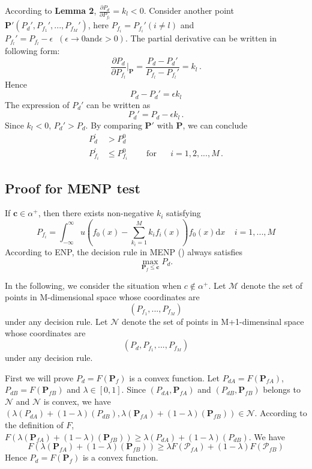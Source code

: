 \documentclass[12pt,journal,a4paper,twoside,onecolumn]{IEEEtran}
\newcommand{\rmnum}[1]{\romannumeral #1}
\begin{document}
\begin{spacing}{2.5}
According to \textbf{Lemma 2}, $\frac{\partial P_d}{\partial P_{f_l}} = k_l < 0$. Consider another point $\mathbf{P}' (P_d', P_{f_1}', ..., P_{f_M}')$, here $P_{f_i} = P_{f_i}' (i \neq l)$ and $P_{f_l}' = P_{f_l} - \epsilon \;\;(\epsilon \rightarrow 0 \text{and} \epsilon >0)$. The partial derivative can be written in following form:
 \begin{equation}
   \frac{\partial P_d}{ \partial P_{f_l}} \bigg|_{\mathbf{P}} = \frac{P_d - P_d'}{P_{f_l} - P_{f_l}'} = k_l\,.
 \end{equation}
 Hence
 \begin{equation}
   P_d - P_d' = \epsilon k_l
 \end{equation}
 The expression of $P_d'$ can be written as
 \begin{equation}
   P_d'= P_d - \epsilon k_l\,.
 \end{equation}
Since $k_l < 0$, $P_d' > P_d$. By comparing $\mathbf{P}'$ with $\mathbf{P}$, we can conclude
\begin{equation}
\begin{split}
  P_{d}^\prime &> P_{d}^0\\
  P_{f_i}^\prime &\leq P_{f_i}^0 \;\;\;\;\;\;\;\;\text{for}\;\;\;\;\;\; i=1, 2, ..., M\,.
\end{split}
\end{equation}

\subsection{Proof for MENP test}
If $\mathbf{c} \in \alpha^+$, then there exists non-negative $k_i$ satisfying
\[
P_{f_i} = \int_{-\infty}^{\infty} u(f_0(x) - \sum_{k_i=1}^{M}k_if_i(x))f_0(x)\mathrm{d}x \;\;\;\;i=1, ..., M
\]
According to ENP, the decision rule in MENP (\rmnum{1}) always satisfies 
\[
\max_{\mathbf{P}_f \leq \mathbf{c}} P_d.
\]

In the following, we consider the situation when $c \notin \alpha^+$. Let $\mathcal{M}$ denote the set of points in M-dimensional space whose coordinates are 
\[
(P_{f_1}, ..., P_{f_M})
\]
under any decision rule. Let $\mathcal{N}$ denote the set of points in M+1-dimensinal space whose coordinates are 
\[
(P_d, P_{f_1}, ..., P_{f_M})
\]
under any decision rule.

First we will prove $P_d = F(\mathbf{P}_f)$ is a convex function. Let $P_{dA} = F(\mathbf{P}_{fA})$, $P_{dB} = F(\mathbf{P}_{fB})$ and $\lambda  \in [0, 1]$. Since $(P_{dA}, \mathbf{P}_{fA})$ and $(P_{dB}, \mathbf{P}_{fB})$ belongs to $\mathcal{N}$ and $\mathcal{N}$ is convex, we have $(\lambda(P_{dA}) + (1 - \lambda)(P_{dB}), \lambda(\mathbf{P}_{fA})+(1-\lambda)(\mathbf{P}_{fB})) \in \mathcal{N}$. According to the definition of $F$, $F(\lambda(\mathbf{P}_{fA})+(1-\lambda)(\mathbf{P}_{fB})) \geq \lambda(P_{dA}) + (1 - \lambda)(P_{dB})$. We have 
\[
F(\lambda(\mathbf{P}_{fA})+(1-\lambda)(\mathbf{P}_{fB})) \geq \lambda F(\mathcal{P}_{fA}) + (1 - \lambda)F(\mathcal{P}_{fB})
\]
Hence $P_d = F(\mathbf{P}_f)$ is a convex function.


\end{spacing}
\end{document}
